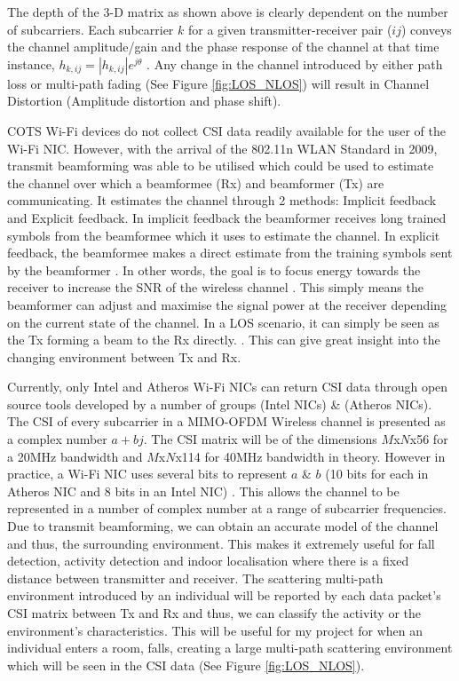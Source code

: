 The depth of the 3-D matrix as shown above is clearly dependent on the number of subcarriers. Each subcarrier $k$ for a given transmitter-receiver pair ($ij$) conveys the channel amplitude/gain and the phase response of the channel at that time instance, $h_{k,ij} = |h_{k,ij}|e^{j\theta}$ \citep{OFDM}. Any change in the channel introduced by either path loss or multi-path fading (See Figure \ref{fig:LOS_NLOS}) will result in Channel Distortion (Amplitude distortion and phase shift).\par 
COTS Wi-Fi devices do not collect CSI data readily available for the user of the Wi-Fi NIC. However, with the arrival of the 802.11n WLAN Standard in 2009, transmit beamforming was able to be utilised which could be used to estimate the channel over which a beamformee (Rx) and beamformer (Tx) are communicating. It estimates the channel through 2 methods: Implicit feedback and Explicit feedback. In implicit feedback the beamformer receives long trained symbols from the beamformee which it uses to estimate the channel. In explicit feedback, the beamformee makes a direct estimate from the training symbols sent by the beamformer \citep{full802.11nStandard}. In other words, the goal is to focus energy towards the receiver to increase the SNR of the wireless channel \citep{beamforming}. This simply means the beamformer can adjust and maximise the signal power at the receiver depending on the current state of the channel. In a LOS scenario, it can simply be seen as the Tx forming a beam to the Rx directly. \citep{beamforming}. This can give great insight into the changing environment between Tx and Rx. \par
Currently, only Intel and Atheros Wi-Fi NICs can return CSI data through open source tools developed by a number of groups \citep{Halperin_csitool} (Intel NICs) \& \citep{Xie:2015:PPD:2789168.2790124} (Atheros NICs). The CSI of every subcarrier in a MIMO-OFDM Wireless channel is presented as a complex number $a+bj$. The CSI matrix will be of the dimensions $M$x$N$x56 for a 20MHz bandwidth and $M$x$N$x114 for 40MHz bandwidth in theory. However in practice, a Wi-Fi NIC uses several bits to represent $a$ \& $b$ (10 bits for each in Atheros NIC and 8 bits in an Intel NIC) \citep{Xie:2015:PPD:2789168.2790124}. This allows the channel to be represented in a number of complex number at a range of subcarrier frequencies. Due to transmit beamforming, we can obtain an accurate model of the channel and thus, the surrounding environment. This makes it extremely useful for fall detection, activity detection and indoor localisation where there is a fixed distance between transmitter and receiver. The scattering multi-path environment introduced by an individual will be reported by each data packet's CSI matrix between Tx and Rx and thus, we can classify the activity or the environment's characteristics. This will be useful for my project for when an individual enters a room, falls, creating a large multi-path scattering environment which will be seen in the CSI data (See Figure \ref{fig:LOS_NLOS}).


